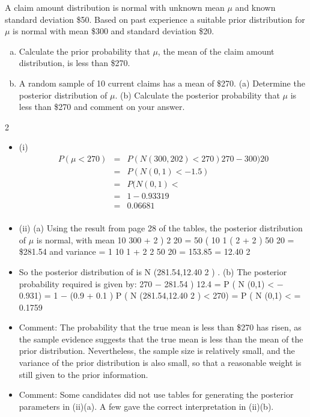 \documentclass[a4paper,12pt]{article}
\begin{document}

A claim amount distribution is normal with unknown mean $\mu$ and known standard deviation \$50. Based on past experience a suitable prior distribution for $\mu$ is normal with mean \$300 and standard deviation \$20.

\begin{enumerate}[(a)]
    \item Calculate the prior probability that $\mu$, the mean of the claim amount distribution, is less than \$270.

  \item A random sample of 10 current claims has a mean of \$270.
(a) Determine the posterior distribution of $\mu$.
(b) Calculate the posterior probability that $\mu$ is less than \$270 and
comment on your answer.

\end{enumerate}


2
\begin{itemize}
\item (i)
\begin{eqnarray*}
P ( \mu < 270) &=& P ( N (300, 20 2 ) < 270)
270 − 300
)
20\\
&=& P ( N (0,1) < − 1.5)\\
&=& P ( N (0,1) <\\
&=& 1 − 0.93319\\
&=& 0.06681\\
\end{eqnarray*}
\item (ii)
(a)
Using the result from page 28 of the tables, the posterior distribution of $\mu$ is
normal, with mean
10  300
+ 2 )
2
20
\mu * = 50
(
10
1
( 2 + 2 )
50
20
= \$281.54
and variance
 =
1
10
1
+ 2
2
50
20
= 153.85 = 12.40 2
\item So the posterior distribution of \mu is N (281.54,12.40 2 ) .
(b)
The posterior probability required is given by:
270 − 281.54
)
12.4
= P ( N (0,1) < − 0.931)
= 1 − (0.9  + 0.1 )
P ( N (281.54,12.40 2 ) < 270) = P ( N (0,1) <
= 0.1759
\item Comment: The probability that the true mean is less than \$270 has risen, as the sample evidence suggests that the true mean is less than the mean of the prior distribution. Nevertheless, the sample size is relatively small, and the variance of the prior distribution is also small, so that a reasonable weight is still given to the prior information.
\item Comment: Some candidates did not use tables for generating the posterior
parameters in (ii)(a). A few gave the correct interpretation in (ii)(b).
\end{itemize}
\end{document}

